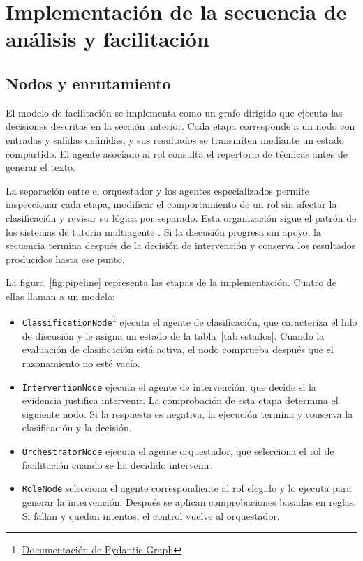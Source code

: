 \section{Implementación de la secuencia de análisis y facilitación}
\label{sec:pipeline}

\subsection{Nodos y enrutamiento}

El modelo de facilitación se implementa como un grafo dirigido que ejecuta las decisiones descritas en la sección anterior. Cada etapa corresponde a un nodo con entradas y salidas definidas, y sus resultados se transmiten mediante un estado compartido. El agente asociado al rol consulta el repertorio de técnicas antes de generar el texto.

La separación entre el orquestador y los agentes especializados permite inspeccionar cada etapa, modificar el comportamiento de un rol sin afectar la clasificación y revisar su lógica por separado. Esta organización sigue el patrón de los sistemas de tutoría multiagente \parencite{LippertEtAl2020}. Si la discusión progresa sin apoyo, la secuencia termina después de la decisión de intervención y conserva los resultados producidos hasta ese punto.

La figura~\ref{fig:pipeline} representa las etapas de la implementación. Cuatro de ellas llaman a un modelo:

\begin{itemize}
    \item \texttt{ClassificationNode}\footnote{\href{https://ai.pydantic.dev/graph/}{Documentación de Pydantic Graph}} ejecuta el agente de clasificación, que caracteriza el hilo de discusión y le asigna un estado de la tabla~\ref{tab:estados}. Cuando la evaluación de clasificación está activa, el nodo comprueba después que el razonamiento no esté vacío.
    \item \texttt{InterventionNode} ejecuta el agente de intervención, que decide si la evidencia justifica intervenir. La comprobación de esta etapa determina el siguiente nodo. Si la respuesta es negativa, la ejecución termina y conserva la clasificación y la decisión.
    \item \texttt{OrchestratorNode} ejecuta el agente orquestador, que selecciona el rol de facilitación cuando se ha decidido intervenir.
    \item \texttt{RoleNode} selecciona el agente correspondiente al rol elegido y lo ejecuta para generar la intervención. Después se aplican comprobaciones basadas en reglas. Si fallan y quedan intentos, el control vuelve al orquestador.
\end{itemize}

